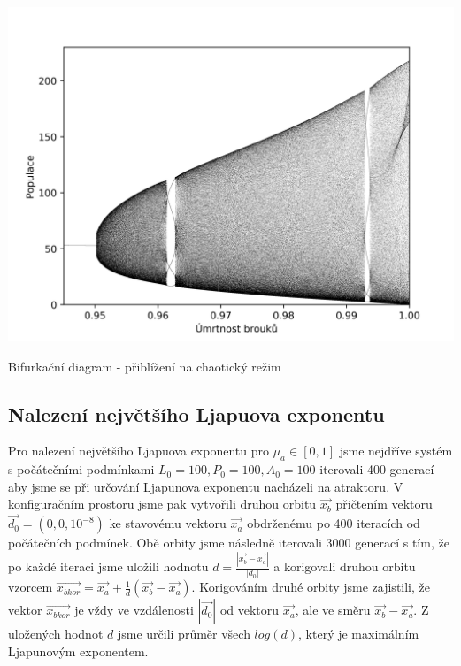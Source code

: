 \documentclass[a4paper, 12pt]{article}
\begin{document}
\begin{graph}[H]
	\centering
\includegraphics[width=\textwidth]{grafy/bifurcation_zoom2.png}
\vspace{-10pt}
\caption{Bifurkační diagram - přiblížení na chaotický režim}
\label{fig:bifurcation_zoom}
\end{graph}

\subsection{Nalezení největšího Ljapuova exponentu}
Pro nalezení největšího Ljapuova exponentu pro $\mu_a\in[0,1]$ jsme nejdříve systém s počátečními podmínkami $L_0=100, P_0=100, A_0=100$ iterovali 400 generací aby jsme se při určování Ljapunova exponentu nacházeli na atraktoru. V konfiguračním prostoru jsme pak vytvořili druhou orbitu $\vec{x_b}$ přičtením vektoru $\vec{d_0}=\left(0,0,10^{-8}\right)$ ke stavovému vektoru $\vec{x_a}$ obdrženému po 400 iteracích od počátečních podmínek. Obě orbity jsme následně iterovali 3000 generací s tím, že po každé iteraci jsme uložili hodnotu $d=\frac{|\vec{x_b}-\vec{x_a}|}{|d_0|}$ a korigovali druhou orbitu vzorcem $\vec{x_{bkor}}=\vec{x_a}+\frac{1}{d}\left(\vec{x_b}-\vec{x_a}\right)$. Korigováním druhé orbity jsme zajistili, že vektor $\vec{x_{bkor}}$ je vždy ve vzdálenosti $|\vec{d_0}|$ od vektoru $\vec{x_a}$, ale ve směru $\vec{x_b}-\vec{x_a}$. Z uložených hodnot $d$ jsme určili průměr všech $log(d)$, který je maximálním Ljapunovým exponentem. 
\end{document}
